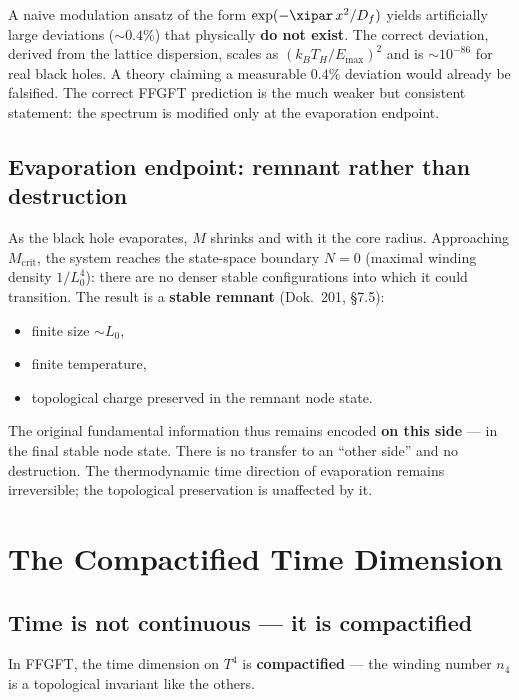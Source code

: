 \begin{erkenntnis}
A naive modulation ansatz of the form $\exp(-\xipar \, x^2 / D_f)$ yields artificially large deviations ($\sim 0.4\%$) that physically \textbf{do not exist}. The correct deviation, derived from the lattice dispersion, scales as $(k_B T_H/E_\text{max})^2$ and is $\sim 10^{-86}$ for real black holes. A theory claiming a measurable $0.4\%$ deviation would already be falsified. The correct FFGFT prediction is the much weaker but consistent statement: the spectrum is modified only at the evaporation endpoint.
\end{erkenntnis}

\subsection{Evaporation endpoint: remnant rather than destruction}

As the black hole evaporates, $M$ shrinks and with it the core radius. Approaching $M_\text{crit}$, the system reaches the state-space boundary $N = 0$ (maximal winding density $1/L_0^4$): there are no denser stable configurations into which it could transition. The result is a \textbf{stable remnant} (Dok.~201, §7.5):
\begin{itemize}
  \item finite size $\sim L_0$,
  \item finite temperature,
  \item topological charge preserved in the remnant node state.
\end{itemize}
The original fundamental information thus remains encoded \textbf{on this side} --- in the final stable node state. There is no transfer to an ``other side'' and no destruction. The thermodynamic time direction of evaporation remains irreversible; the topological preservation is unaffected by it.

\section{The Compactified Time Dimension}

\subsection{Time is not continuous --- it is compactified}

In FFGFT, the time dimension on $T^4$ is \textbf{compactified} --- the winding number $n_4$ is a topological invariant like the others.


